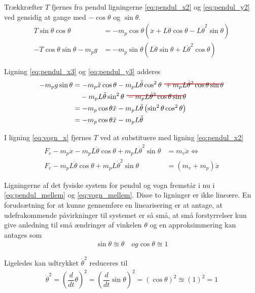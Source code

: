 Trækkræfter $T$ fjernes fra pendul ligningerne \ref{eq:pendul_x2} og \ref{eq:pendul_y2} ved gensidig at gange med $-\cos{\theta}$ og $\sin{\theta}$. 
\begin{align}
T\sin{\theta}\cos{\theta} &=   -m_p \cos{\theta} \left( \ddot{x} + L\ddot{\theta}\cos{\theta} - L\dot{\theta}^2\sin{\theta} \right) \label{eq:pendul_x3} \\
-T\cos{\theta}\sin{\theta} - m_p g &=  -m_p \sin{\theta} \left( L\ddot{\theta}\sin{\theta} + L\dot{\theta}^2\cos{\theta}\right) \label{eq:pendul_y3}
\end{align}

Ligning \ref{eq:pendul_x3} og \ref{eq:pendul_y3} adderes
\begin{align}
-m_p g \sin{\theta}    &= - m_p \ddot{x}\cos{\theta}
						- m_p L\ddot{\theta}\cos^2\theta\
						\hcancel[red]{+ m_p L \dot{\theta}^2\cos{\theta}\sin{\theta}}\\
					   &\quad - m_p L\ddot{\theta}\sin^2\theta\
					    \hcancel[red]{- m_p L \dot{\theta}^2\cos{\theta}\sin{\theta}} \\
					   &=- m_p \cos{\theta}\ddot{x} - m_p L \ddot{\theta} \left(\sin^2 \theta \cos^2 \theta \right) \\
					   &=- m_p \cos{\theta}\ddot{x} - m_p L \ddot{\theta} \label{eq:pendul_mellem}
\end{align}

I ligning \ref{eq:vogn_x} fjernes $T$ ved at substituere med ligning \ref{eq:pendul_x2}
\begin{align}
F_c - m_p \ddot{x} - m_p L\ddot{\theta}\cos{\theta} + m_p L\dot{\theta}^2\sin{\theta} &= m_v \ddot{x} \Leftrightarrow \\
F_c - m_p L\ddot{\theta}\cos{\theta} + m_p L\dot{\theta}^2\sin{\theta} &= (m_v + m_p)  \ddot{x} \label{eq:vogn_mellem}
\end{align}

Ligningerne af det fysiske system for pendul og vogn fremstår i nu i \ref{eq:pendul_mellem} og \ref{eq:vogn_mellem}. Disse to ligninger er ikke lineære. En forudsætning for at kunne gennemføre en linearisering er at antage, at udefrakommende påvirkninger til systemet er så små, at små forstyrrelser kun give anledning til små ændringer af vinkelen $\theta$ og en approksimmering kan antages som
\begin{align}
\sin{\theta} \approxeq \theta \quad og \cos{\theta} \approxeq 1
\end{align} 

Ligeledes kan udtrykket $\dot{\theta}^2$ reduceres til
\begin{align}
\dot{\theta}^2 = \left( \dfrac{d}{dt}\theta \right)^2 =  \left( \dfrac{d}{dt}\sin{\theta} \right)^2 = \left(\cos{\theta}\right)^2 \approxeq (1)^2 = 1
\end{align}

